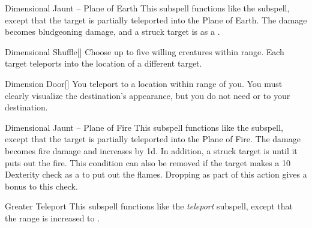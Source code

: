 \begin{ability}[\nth{2}]{Dimensional Jaunt -- Plane of Earth}
This subspell functions like the  subspell, except that the target is partially teleported into the Plane of Earth.
The damage becomes bludgeoning damage, and a struck target is  as a .
\end{ability}
\vspace{0.25em}



\begin{ability}[\nth{2}]{Dimensional Shuffle}[]
Choose up to five willing creatures within \rngmed range.
Each target teleports into the location of a different target.
\end{ability}
\vspace{0.25em}



\begin{ability}[\nth{3}]{Dimension Door}[]
You teleport to a location within \rngext range of you.
You must clearly visualize the destination's appearance, but you do not need  or  to your destination.
\end{ability}
\vspace{0.25em}



\begin{ability}[\nth{3}]{Dimensional Jaunt -- Plane of Fire}
This subspell functions like the  subspell, except that the target is partially teleported into the Plane of Fire.
The damage becomes fire damage and increases by \plus1d.
In addition, a struck target is  until it puts out the fire.
This condition can also be removed if the target makes a  10 Dexterity check as a  to put out the flames.
Dropping  as part of this action gives a  bonus to this check.
\end{ability}
\vspace{0.25em}



\begin{ability}[\nth{3}]{Greater Teleport}
This subspell functions like the \textit{teleport} subspell, except that the range is increased to \rngext.
\end{ability}
\vspace{0.25em}



